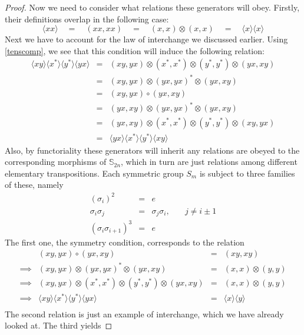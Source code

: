 \documentclass{amsbook} %
\numberwithin{section}{chapter}
\begin{document}
\begin{proof}
Now we need to consider what relations these generators will obey. Firstly, their definitions overlap in the following case:
\[ \langle xx \rangle \quad = \quad (xx,xx) \quad = \quad (x,x) \otimes (x,x) \quad = \quad \langle x \rangle\langle x \rangle \]
Next we have to account for the law of interchange we discussed earlier. Using \cref{tenscomp}, we see that this condition will induce the following relation:
\[ \begin{array}{rll}
			\langle xy \rangle \langle x^* \rangle \langle y^* \rangle \langle yx \rangle & = & (xy, yx) \otimes (x^*, x^*) \otimes (y^*, y^*) \otimes (yx, xy) \\
			& = & (xy, yx) \otimes (yx, yx)^* \otimes (yx, xy) \\
			& = & (xy,yx) \circ (yx, xy) \\
			& = & (yx, xy) \otimes (yx, yx)^* \otimes (yx, xy) \\
			& = & (yx, xy) \otimes (x^*, x^*) \otimes (y^*, y^*) \otimes (xy, yx) \\
			& = & \langle yx \rangle \langle x^* \rangle \langle y^* \rangle \langle xy \rangle
		\end{array}
\]
Also, by functoriality these generators will inherit any relations are obeyed to the corresponding morphisms of $\mathbb{S}_{2n}$, which in turn are just relations among different elementary transpositions. Each symmetric group $S_m$ is subject to three families of these, namely
\[ \begin{array}{rrll}
			(\sigma_i)^2 & = & e & \\
			\sigma_i \sigma_j & = & \sigma_j \sigma_i, & \quad j \neq i \pm 1 \\
			(\sigma_i \sigma_{i+1})^3 & = & e &
		\end{array}
\]
The first one, the symmetry condition, corresponds to the relation
\[ \begin{array}{rrll}
			& (xy, yx) \circ (yx, xy) & = & (xy, xy) \\
			\implies & (xy, yx) \otimes (yx, yx)^* \otimes (yx, xy) & = & (x, x) \otimes (y,y) \\
			\implies & (xy, yx) \otimes (x^*, x^*) \otimes (y^*, y^*)  \otimes (yx, xy) & = & (x, x) \otimes (y,y) \\
			\implies & \langle xy \rangle\langle x^* \rangle\langle y^* \rangle\langle yx \rangle & = & \langle x \rangle\langle y \rangle \\
		\end{array}
\]
The second relation is just an example of interchange, which we have already looked at. The third yields

\end{proof}
\end{document}
